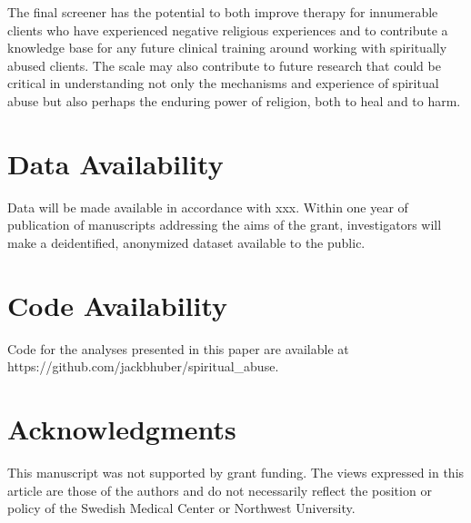 \documentclass[
  letterpaper,
]{article}
\begin{document}
The final screener has the potential to both improve therapy for
innumerable clients who have experienced negative religious experiences
and to contribute a knowledge base for any future clinical training
around working with spiritually abused clients. The scale may also
contribute to future research that could be critical in understanding
not only the mechanisms and experience of spiritual abuse but also
perhaps the enduring power of religion, both to heal and to harm.


\chapter*{Data Availability}\label{data-availability}


Data will be made available in accordance with xxx. Within one year of
publication of manuscripts addressing the aims of the grant,
investigators will make a deidentified, anonymized dataset available to
the public.


\chapter*{Code Availability}\label{code-availability}


Code for the analyses presented in this paper are available at
https://github.com/jackbhuber/spiritual\_abuse.


\chapter*{Acknowledgments}\label{acknowledgments}


This manuscript was not supported by grant funding. The views expressed
in this article are those of the authors and do not necessarily reflect
the position or policy of the Swedish Medical Center or Northwest
University.

\end{document}
